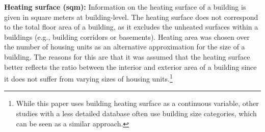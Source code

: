 \documentclass[12pt,twoside]{reedthesis}
\begin{document}
\textbf{Heating surface (sqm):} Information on the heating surface of a building is given in square meters at building-level. The heating surface does not correspond to the total floor area of a building, as it excludes the unheated surfaces within a buildings (e.g., building corridors or basements). Heating area was chosen over the number of housing units as an alternative approximation for the size of a building. The reasons for this are that it was assumed that the heating surface better reflects the ratio between the interior and exterior area of a building since it does not suffer from varying sizes of housing units.\footnote{While this paper uses building heating surface as a continuous variable, other studies with a less detailed database often use building size categories, which can be seen as a similar approach.}
\begin{table}[]
\centering
\caption{Variables and data sources}
\label{tab:variables}
\end{table}
\end{document}
